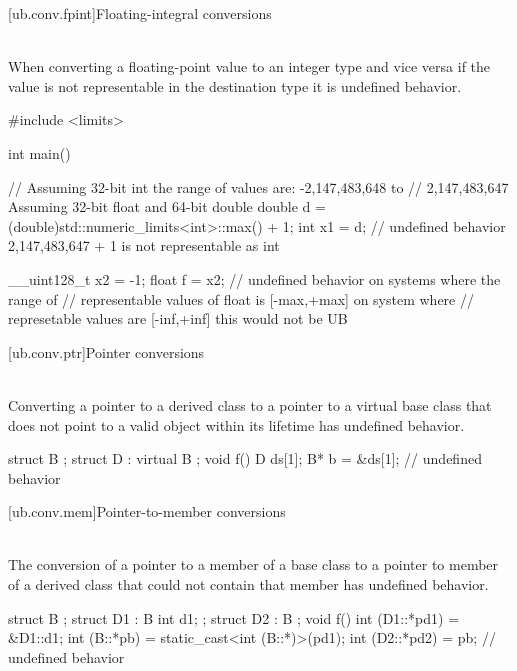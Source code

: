 {[ub.conv.fpint]{Floating-integral conversions}

\pnum
{} \\
When converting a floating-point value to an integer type and vice versa if
the value is not representable in the destination type it is undefined behavior.

\pnum
\begin{example}
\begin{codeblock}
#include <limits>

int main() {
  // Assuming 32-bit int the range of values are: -2,147,483,648 to
  // 2,147,483,647 Assuming 32-bit float and 64-bit double
  double d = (double)std::numeric_limits<int>::max() + 1;
  int x1 = d;   // undefined behavior 2,147,483,647 + 1 is not representable as int

  __uint128_t x2 = -1;
  float f = x2; // undefined behavior on systems where the range of
                // representable values of float is [-max,+max] on system where
                // represetable values are [-inf,+inf] this would not be UB
}
\end{codeblock}
\end{example}

[ub.conv.ptr]{Pointer conversions}

\pnum
{} \\
Converting
a pointer to a derived class 
to
a pointer to a virtual base class 
that does not point to
a valid object
within its lifetime
has undefined behavior.

\pnum
\begin{example}
\begin{codeblock}
struct B {};
struct D : virtual B {};
void f()
{
  D ds[1];
  B* b = &ds[1];    // undefined behavior
}
\end{codeblock}
\end{example}

[ub.conv.mem]{Pointer-to-member conversions}

\pnum
{} \\
The conversion of
a pointer to a member of a base class
to a pointer to member of a derived class
that could not contain that member
has undefined behavior.

\pnum
\begin{example}
\begin{codeblock}
struct B {};
struct D1 : B { int d1; };
struct D2 : B {};
void f()
{
  int (D1::*pd1) = &D1::d1;
  int (B::*pb) = static_cast<int (B::*)>(pd1);
  int (D2::*pd2) = pb;  // undefined behavior
}
\end{codeblock}
\end{example}



}
